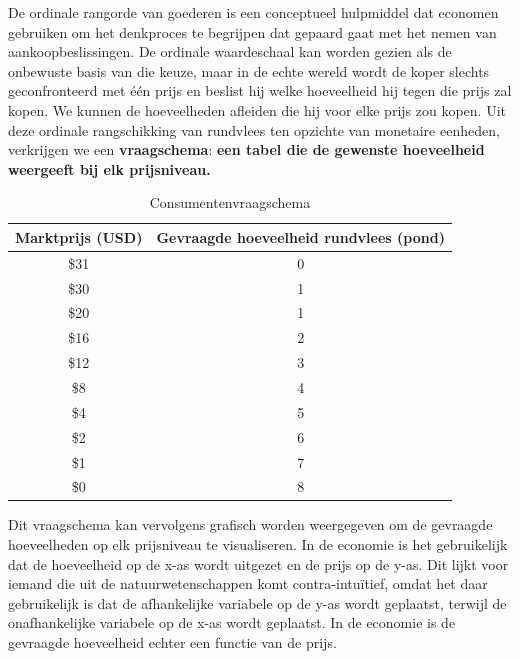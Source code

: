 De ordinale rangorde van goederen is een conceptueel hulpmiddel dat economen gebruiken om het denkproces te begrijpen dat gepaard gaat met het nemen van aankoopbeslissingen. De ordinale waardeschaal kan worden gezien als de onbewuste basis van die keuze, maar in de echte wereld wordt de koper slechts geconfronteerd met één prijs en beslist hij welke hoeveelheid hij tegen die prijs zal kopen. We kunnen de hoeveelheden afleiden die hij voor elke prijs zou kopen. Uit deze ordinale rangschikking van rundvlees ten opzichte van monetaire eenheden, verkrijgen we een \textbf{vraagschema}: \textbf{een tabel die de gewenste hoeveelheid weergeeft bij elk prijsniveau.}

\begin{table}[!htb]
\centering
\begin{tabular}{|c|c|}  %
\hline  %
    \cellcolor{gray!25}Marktprijs (USD) &
    \cellcolor{gray!25}Gevraagde hoeveelheid rundvlees (pond)\\
\hline  %
 \$31 & 0 \\ \hline
 \$30 & 1 \\ \hline
 \$20 & 1 \\ \hline
 \$16 & 2 \\ \hline
 \$12 & 3 \\ \hline
 \$8 & 4 \\ \hline
 \$4 & 5 \\ \hline
 \$2 & 6 \\ \hline
 \$1 & 7 \\ \hline
 \$0 & 8 \\ \hline  %
\end{tabular}
\caption{Consumentenvraagschema}
\label{tab3}
\end{table}

Dit vraagschema kan vervolgens grafisch worden weergegeven om de gevraagde hoeveelheden op elk prijsniveau te visualiseren. In de economie is het gebruikelijk dat de hoeveelheid op de x-as wordt uitgezet en de prijs op de y-as. Dit lijkt voor iemand die uit de natuurwetenschappen komt contra-intuïtief, omdat het daar gebruikelijk is dat de afhankelijke variabele op de y-as wordt geplaatst, terwijl de onafhankelijke variabele op de x-as wordt geplaatst. In de economie is de gevraagde hoeveelheid echter een functie van de prijs.

